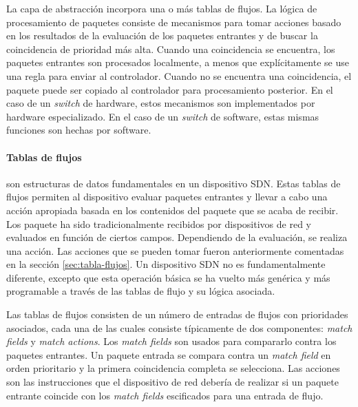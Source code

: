\documentclass[10pt,journal,compsoc]{IEEEtran}
\begin{document}
La capa de abstracción incorpora una o más tablas de flujos. La lógica de procesamiento de paquetes consiste de mecanismos para tomar acciones basado en los resultados de la evaluación de los paquetes entrantes y de buscar la coincidencia de prioridad más alta. Cuando una coincidencia se encuentra, los paquetes entrantes son procesados localmente, a menos que explícitamente se use una regla para enviar al controlador. Cuando no se encuentra una coincidencia, el paquete puede ser copiado al controlador para procesamiento posterior. En el caso de un \emph{switch} de hardware, estos mecanismos son implementados por hardware especializado. En el caso de un \emph{switch} de software, estas mismas funciones son hechas por software.

\paragraph{Tablas de flujos} son estructuras de datos fundamentales en un dispositivo SDN. Estas tablas de flujos permiten al dispositivo evaluar paquetes entrantes y llevar a cabo una acción apropiada basada en los contenidos del paquete que se acaba de recibir. Los paquete ha sido tradicionalmente recibidos por dispositivos de red y evaluados en función de ciertos campos. Dependiendo de la evaluación, se realiza una acción. Las acciones que se pueden tomar fueron anteriormente comentadas en la sección \ref{sec:tabla-flujos}. Un dispositivo SDN no es fundamentalmente diferente, excepto que esta operación básica se ha vuelto más genérica y más programable a través de las tablas de flujo y su lógica asociada.

Las tablas de flujos consisten de un número de entradas de flujos con prioridades asociados, cada una de las cuales consiste típicamente de dos componentes: \emph{match fields} y \emph{match actions}. Los \emph{match fields} son usados para compararlo contra los paquetes entrantes. Un paquete entrada se compara contra un \emph{match field} en orden prioritario y la primera coincidencia completa se selecciona. Las acciones son las instrucciones que el dispositivo de red debería de realizar si un paquete entrante coincide con los \emph{match fields} escificados para una entrada de flujo.
\end{document}
